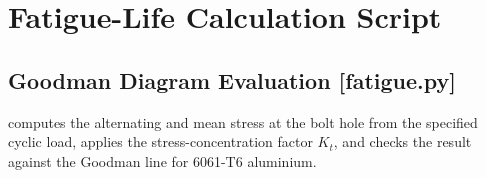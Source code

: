 \chapter{Fatigue-Life Calculation Script}
\label{App:Python}

\section{Goodman Diagram Evaluation [fatigue.py]}

\begin{listing}[H]
    
    \caption{Python script evaluating the Goodman fatigue criterion at the bolt hole}
    \label{lst:fatigue}
\end{listing}

 computes the alternating and mean stress at the bolt hole
from the specified cyclic load, applies the stress-concentration factor
$K_t$, and checks the result against the Goodman line for 6061-T6 aluminium.
